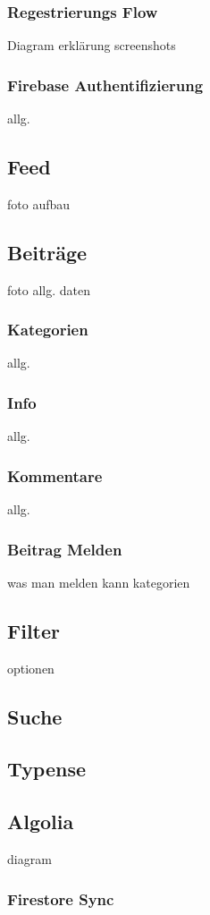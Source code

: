 \subsubsection{Regestrierungs Flow}

Diagram
erklärung
screenshots


\subsubsection{Firebase Authentifizierung}
allg.


\subsection{Feed}
foto
aufbau
\subsection{Beiträge}
foto
allg.
daten
\subsubsection{Kategorien}
allg.


\subsubsection{Info}
allg.
\subsubsection{Kommentare}
allg.
\subsubsection{Beitrag Melden}
was  man melden kann
kategorien


\subsection{Filter}
optionen
\subsection{Suche}
\subsection{Typense}
\subsection{Algolia}
diagram
\subsubsection{Firestore Sync}

